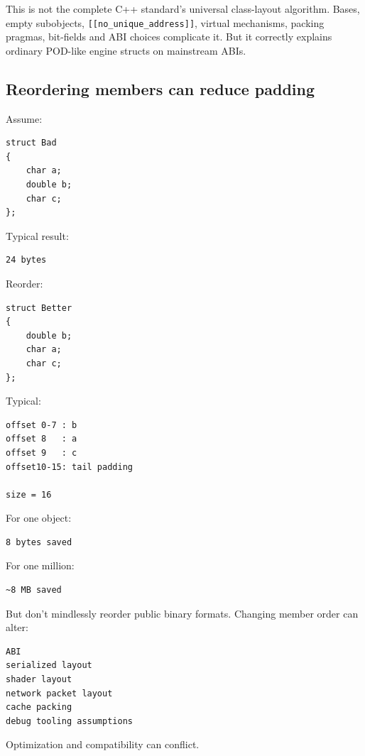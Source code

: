 This is not the complete C++ standard's universal class-layout algorithm. Bases, empty subobjects, \texttt{{[}{[}no\_unique\_address{]}{]}}, virtual mechanisms, packing pragmas, bit-fields and ABI choices complicate it. But it correctly explains ordinary POD-like engine structs on mainstream ABIs.

\subsection{Reordering members can reduce padding}\label{01-foundations-i-ch003-reordering-members-can-reduce-padding}

Assume:

\begin{verbatim}
struct Bad
{
    char a;
    double b;
    char c;
};
\end{verbatim}

Typical result:

\begin{verbatim}
24 bytes
\end{verbatim}

Reorder:

\begin{verbatim}
struct Better
{
    double b;
    char a;
    char c;
};
\end{verbatim}

Typical:

\begin{verbatim}
offset 0-7 : b
offset 8   : a
offset 9   : c
offset10-15: tail padding

size = 16
\end{verbatim}

For one object:

\begin{verbatim}
8 bytes saved
\end{verbatim}

For one million:

\begin{verbatim}
~8 MB saved
\end{verbatim}

But don't mindlessly reorder public binary formats. Changing member order can alter:

\begin{verbatim}
ABI
serialized layout
shader layout
network packet layout
cache packing
debug tooling assumptions
\end{verbatim}

Optimization and compatibility can conflict.

